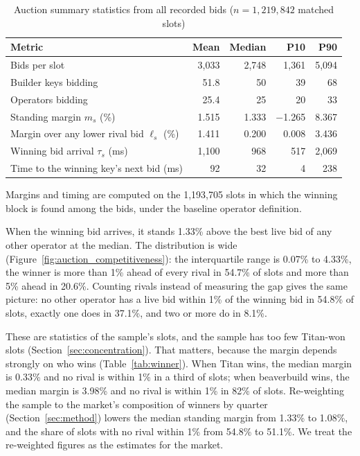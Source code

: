 \documentclass[11pt]{article}
\begin{document}
\begin{table}[!htbp]
\centering
\caption{Auction summary statistics from all recorded bids ($n = 1{,}219{,}842$ matched slots)}
\label{tab:auction_summary}
\begin{tabular}{lrrrr}
\toprule
Metric & Mean & Median & P10 & P90 \\
\midrule
Bids per slot & 3{,}033 & 2{,}748 & 1{,}361 & 5{,}094 \\
Builder keys bidding & 51.8 & 50 & 39 & 68 \\
Operators bidding & 25.4 & 25 & 20 & 33 \\
Standing margin $m_s$ (\%) & 1.515 & 1.333 & $-$1.265 & 8.367 \\
Margin over any lower rival bid $\ell_s$ (\%) & 1.411 & 0.200 & 0.008 & 3.436 \\
Winning bid arrival $\tau_s$ (ms) & 1{,}100 & 968 & 517 & 2{,}069 \\
Time to the winning key's next bid (ms) & 92 & 32 & 4 & 238 \\
\bottomrule
\end{tabular}

\vspace{0.5em}
\footnotesize Margins and timing are computed on the 1,193,705 slots in
which the winning block is found among the bids, under the baseline operator
definition.
\end{table}

When the winning bid arrives, it stands 1.33\% above the best live bid of
any other operator at the median. The distribution is wide
(Figure~\ref{fig:auction_competitiveness}): the interquartile range is
0.07\% to 4.33\%, the winner is more than 1\% ahead of every rival in
54.7\% of slots and more than 5\% ahead in 20.6\%. Counting rivals instead of
measuring the gap gives the same picture: no other operator has a live bid
within 1\% of the winning bid in 54.8\% of slots, exactly one does in
37.1\%, and two or more do in 8.1\%.

These are statistics of the sample's slots, and the sample has too few
Titan-won slots (Section~\ref{sec:concentration}). That matters, because the
margin depends strongly on who wins (Table~\ref{tab:winner}). When Titan
wins, the median margin is 0.33\% and no rival is within 1\% in a third of
slots; when beaverbuild wins, the median margin is 3.98\% and no rival is
within 1\% in 82\% of slots. Re-weighting the sample to the market's
composition of winners by quarter (Section~\ref{sec:method}) lowers the
median standing margin from 1.33\% to 1.08\%, and the share of slots with no
rival within 1\% from 54.8\% to 51.1\%. We treat the re-weighted figures as
the estimates for the market.
\end{document}
